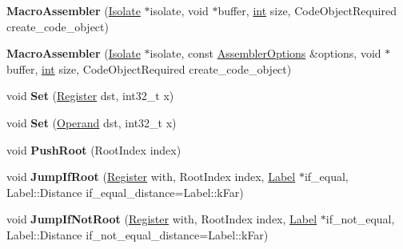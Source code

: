 \begin{DoxyCompactItemize}
{\bfseries Macro\+Assembler} (\mbox{\hyperlink{classv8_1_1internal_1_1Isolate}{Isolate}} $\ast$isolate, void $\ast$buffer, \mbox{\hyperlink{classint}{int}} size, Code\+Object\+Required create\+\_\+code\+\_\+object)
\item 
\mbox{\label{classv8_1_1internal_1_1MacroAssembler_a118ab3d38490e9a50ee0157274ac3dc9}} 
{\bfseries Macro\+Assembler} (\mbox{\hyperlink{classv8_1_1internal_1_1Isolate}{Isolate}} $\ast$isolate, const \mbox{\hyperlink{structv8_1_1internal_1_1AssemblerOptions}{Assembler\+Options}} \&options, void $\ast$buffer, \mbox{\hyperlink{classint}{int}} size, Code\+Object\+Required create\+\_\+code\+\_\+object)
\item 
\mbox{\label{classv8_1_1internal_1_1MacroAssembler_a584ef2b8202ca27ac4462bc39984021b}} 
void {\bfseries Set} (\mbox{\hyperlink{classv8_1_1internal_1_1Register}{Register}} dst, int32\+\_\+t x)
\item 
\mbox{\label{classv8_1_1internal_1_1MacroAssembler_abe8f14ce5f510ad88a4e3314e4cbfb92}} 
void {\bfseries Set} (\mbox{\hyperlink{classv8_1_1internal_1_1Operand}{Operand}} dst, int32\+\_\+t x)
\item 
\mbox{\label{classv8_1_1internal_1_1MacroAssembler_a91239e2f90525c993ce4dacef2b8219c}} 
void {\bfseries Push\+Root} (Root\+Index index)
\item 
\mbox{\label{classv8_1_1internal_1_1MacroAssembler_a0c0a34e88bc94afc76f4a9caa7241832}} 
void {\bfseries Jump\+If\+Root} (\mbox{\hyperlink{classv8_1_1internal_1_1Register}{Register}} with, Root\+Index index, \mbox{\hyperlink{classv8_1_1internal_1_1Label}{Label}} $\ast$if\+\_\+equal, Label\+::\+Distance if\+\_\+equal\+\_\+distance=Label\+::k\+Far)
\item 
\mbox{\label{classv8_1_1internal_1_1MacroAssembler_a48b83c64473d71b01f907c1d14116fb2}} 
void {\bfseries Jump\+If\+Not\+Root} (\mbox{\hyperlink{classv8_1_1internal_1_1Register}{Register}} with, Root\+Index index, \mbox{\hyperlink{classv8_1_1internal_1_1Label}{Label}} $\ast$if\+\_\+not\+\_\+equal, Label\+::\+Distance if\+\_\+not\+\_\+equal\+\_\+distance=Label\+::k\+Far)

\end{DoxyCompactItemize}
